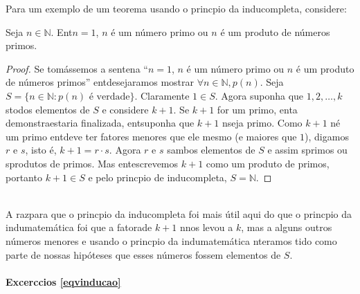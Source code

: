 Para um exemplo de um teorema usando o princ\ih pio da indu\cao completa, considere:  
\begin{teob}\label{indteo6}
Seja $n\in\mathbb{N}$. Ent\ao $n=1$, $n$ \'e um n\'umero primo ou $n$ \'e um produto de n\'umeros primos.
\end{teob}
\begin{proof}
Se tom\'assemos a senten\cc a ``$n=1$, $n$ \'e um n\'umero primo ou $n$ \'e um produto de n\'umeros primos'' ent\ao desejar\ih amos mostrar $\forall n\in\mathbb{N}, p(n)$. Seja $S=\{n\in\mathbb{N}: p(n) \textrm{ \'e verdade}\}$. Claramente $1\in S$. Agora suponha que $1,2,\ldots,k$ s\ao todos elementos de $S$ e considere $k+1$. Se $k+1$ for um primo, ent\ao a demonstra\cao estaria finalizada, ent\ao suponha que $k+1$ n\ao seja primo. Como $k+1$ n\ao \'e um primo ent\ao deve ter fatores menores que ele mesmo (e maiores que $1$), digamos $r$ e $s$, isto \'e, $k+1=r\cdot s$. Agora $r$ e $s$ s\ao ambos elementos de $S$ e assim s\ao primos ou s\ao produtos de primos. Mas ent\ao escrevemos $k+1$ como um produto de primos, portanto $k+1\in S$ e pelo princ\ih pio de indu\cao completa, $S=\mathbb{N}$. 
\end{proof}
\\

A raz\ao para que o princ\ih pio da indu\cao completa foi mais \'util aqui do que o princ\ih pio da indu\cao matem\'atica foi que a fatora\cao de $k+1$ n\ao nos levou a $k$, mas a alguns outros n\'umeros menores e usando o princ\ih pio da indu\cao matem\'atica n\ao ter\ih amos tido como parte de nossas hip\'oteses que esses n\'umeros fossem elementos de $S$.

\paragraph{Excerc\ih cios \ref{eqvinducao}}

